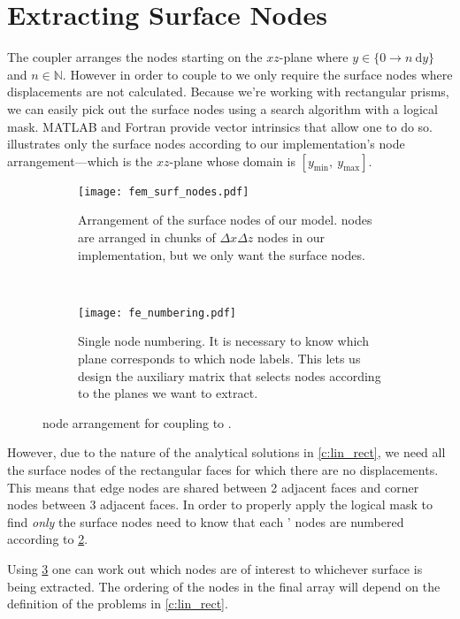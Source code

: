 \section{Extracting Surface Nodes}
The  coupler arranges the nodes starting on the $ xz $-plane where $ y \in \{0 \to n~\mathrm{d}y\}$ and $n\in \mathbb{N} $. However in order to couple  to  we only require the surface nodes where displacements are not calculated. Because we're working with rectangular prisms, we can easily pick out the surface nodes using a search algorithm with a logical mask. MATLAB and Fortran provide vector intrinsics that allow one to do so.  illustrates only the surface nodes according to our implementation's node arrangement---which is the $ xz $-plane whose domain is $[y_{\text{min}},~ y_{\text{max}}]$.
\begin{figure}
	\centering
	\begin{subfigure}[b]{0.45\linewidth}
		\centering
		\texttt{[image: fem\_surf\_nodes.pdf]}
		\caption[Surface nodes of our  model.]{Arrangement of the surface nodes of our  model.  nodes are arranged in chunks of $ \Delta x \Delta z $ nodes in our implementation, but we only want the surface nodes.}
		\label{f:fem_surf_nodes}
	\end{subfigure}
	~
	\begin{subfigure}[b]{0.45\linewidth}
		\centering
		\texttt{[image: fe\_numbering.pdf]}
		\caption[Single finite element node numbering.]{Single  node numbering. It is necessary to know which  plane corresponds to which node labels. This lets us design the auxiliary matrix that selects nodes according to the planes we want to extract.}
		\label{f:fe_numbering}
	\end{subfigure}
	\caption[Finite Element node arrangement for coupling to Discrete Dislocation Dynamics.]{ node arrangement for coupling to .}
	\label{f:fem_node_arr}
\end{figure}
However, due to the nature of the analytical solutions in \cref{c:lin_rect}, we need all the surface nodes of the rectangular faces for which there are no displacements. This means that edge nodes are shared between 2 adjacent faces and corner nodes between 3 adjacent faces. In order to properly apply the logical mask to find \emph{only} the surface nodes need to know that each ' nodes are numbered according to \cref{f:fe_numbering}.

Using \cref{f:fem_node_arr} one can work out which nodes are of interest to whichever surface is being extracted. The ordering of the nodes in the final array will depend on the definition of the problems in \cref{c:lin_rect}.

